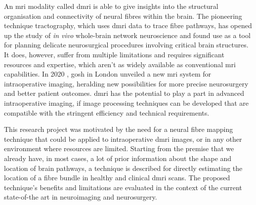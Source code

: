 An \gls{mri} modality called \gls{dmri} is able to give insights into the structural organisation and connectivity of neural fibres within the brain.
The pioneering technique tractography, which uses \gls{dmri} data to trace fibre pathways, has opened up the study of \textit{in vivo} whole-brain network neuroscience and found use as a tool for planning delicate neurosurgical procedures involving critical brain structures.
It does, however, suffer from multiple limitations and requires significant resources and expertise, which aren't as widely available as conventional \gls{mri} capabilities\autocite{GeorgeZakiGhali2020}.
In 2020 , \gls{gosh} in London unveiled a new \gls{mri} system for intraoperative imaging, heralding new possibilities for more precise neurosurgery and better patient outcomes.
\Gls{dmri} has the potential to play a part in advanced intraoperative imaging, if image processing techniques can be developed that are compatible with the stringent efficiency and technical requirements.

This research project was motivated by the need for a neural fibre mapping technique that could be applied to intraoperative \gls{dmri} images, or in any other environment where resources are limited.
Starting from the premise that we already have, in most cases, a lot of prior information about the shape and location of brain pathways, a technique is described for directly estimating the location of a fibre bundle in healthy and clinical \gls{dmri} scans.
The proposed technique's benefits and limitations are evaluated in the context of the current state-of-the art in neuroimaging and neurosurgery.
